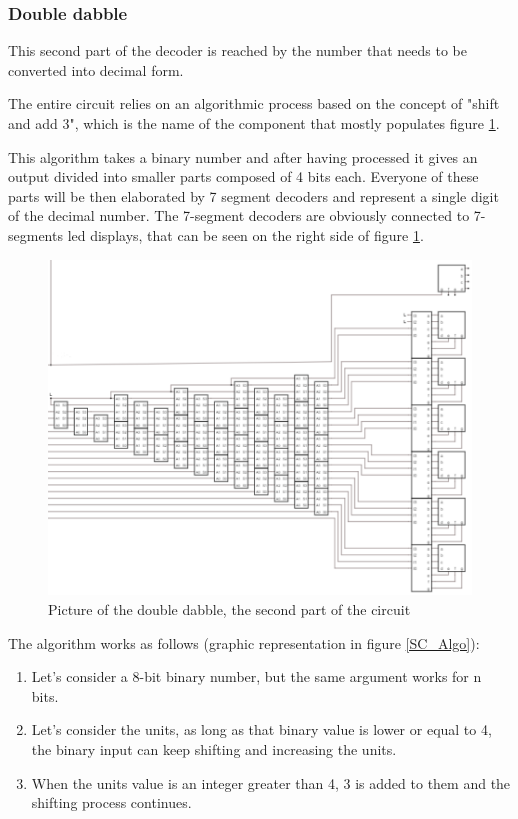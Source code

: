 \documentclass{article}
\begin{document}
\subsubsection{Double dabble}

This second part of the decoder is reached by the number that needs to be converted into decimal form. 

The entire circuit relies on an algorithmic process based on the concept of "shift and add 3", which is the name of the component that mostly populates figure \ref{DoubleDabble}.

This algorithm takes a binary number and after having processed it gives an output divided into smaller parts composed of 4 bits each. Everyone of these parts will be then elaborated by 7 segment decoders and represent a single digit of the decimal number. The 7-segment decoders are obviously connected to 7-segments led displays, that can be seen on the right side of figure \ref{DoubleDabble}.

\begin{figure}[h]
    \centering
    \includegraphics[scale=0.43]{SC_DoubleDabble}
    \caption{Picture of the double dabble, the second part of the circuit}
    \label{DoubleDabble}
  \end{figure}


The algorithm works as follows (graphic representation in figure \ref{SC_Algo}):
\begin{enumerate}
  \item Let's consider a 8-bit binary number, but the same argument works for n bits. 
  \item Let's consider the units, as long as that binary value is lower or equal to 4, the binary input can keep shifting and increasing the units.
  \item When the units value is an integer greater than 4, 3 is added to them and the shifting process continues.
\end{enumerate}
\end{document}
